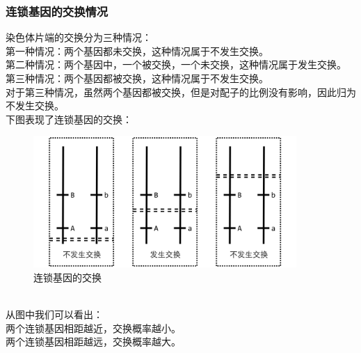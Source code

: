 \documentclass[UTF8]{ctexart}
\begin{document}
\subsubsection{连锁基因的交换情况}
    染色体片端的交换分为三种情况：\\[3mm]
    第一种情况：两个基因都未交换，这种情况属于不发生交换。\\[3mm]
    第二种情况：两个基因中，一个被交换，一个未交换，这种情况属于发生交换。\\[3mm]
    第三种情况：两个基因都被交换，这种情况属于不发生交换。\\[3mm]
    对于第三种情况，虽然两个基因都被交换，但是对配子的比例没有影响，因此归为不发生交换。\\[6mm]
    下图表现了连锁基因的交换：\vspace{5pt}
    \begin{figure}[h]
        \begin{center}
            \includegraphics[width=10cm]{BiologyImage/60.jpg}
        \end{center}
        \caption{连锁基因的交换}
    \end{figure}\\
    从图中我们可以看出：\\[3mm]
    两个连锁基因相距越近，交换概率越小。\\[3mm]
    两个连锁基因相距越远，交换概率越大。

\newpage
\end{document}
